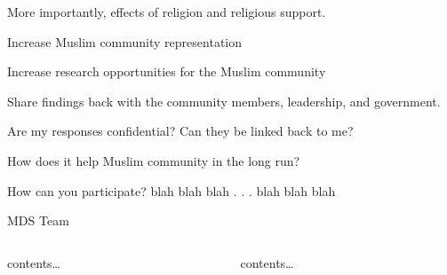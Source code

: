 \documentclass[
  ignorenonframetext,
  aspectratio=169,
]{beamer}
\begin{document}
\begin{frame}{More importantly, effects of religion and religious
support.}
\label{more-importantly-effects-of-religion-and-religious-support.}
\end{frame}

\begin{frame}{Increase Muslim community representation}
\label{increase-muslim-community-representation}
\end{frame}

\begin{frame}{Increase research opportunities for the Muslim community}
\label{increase-research-opportunities-for-the-muslim-community}
\end{frame}

\begin{frame}{Share findings back with the community members,
leadership, and government.}
\label{share-findings-back-with-the-community-members-leadership-and-government.}
\end{frame}

\begin{frame}{Are my responses confidential?}
\label{are-my-responses-confidential}
Can they be linked back to me?
\end{frame}

\begin{frame}{How does it help Muslim community in the long run?}
\label{how-does-it-help-muslim-community-in-the-long-run}
\end{frame}

\begin{frame}{How can you participate?}
\label{how-can-you-participate}
blah blah blah . . . blah blah blah
\end{frame}

\begin{frame}{MDS Team}
\label{mds-team}
\begin{columns}[T]
\begin{column}{0.4\textwidth}
contents\ldots{}
\end{column}

\begin{column}{0.6\textwidth}
contents\ldots{}
\end{column}
\end{columns}
\end{frame}
\end{document}
